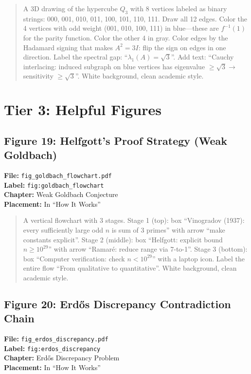 \begin{quote}
A 3D drawing of the hypercube $Q_3$ with 8 vertices labeled as binary strings: 000, 001, 010, 011, 100, 101, 110, 111. Draw all 12 edges. Color the 4 vertices with odd weight (001, 010, 100, 111) in blue---these are $f^{-1}(1)$ for the parity function. Color the other 4 in gray. Color edges by the Hadamard signing that makes $A^2 = 3I$: flip the sign on edges in one direction. Label the spectral gap: ``$\lambda_1(A) = \sqrt{3}$''. Add text: ``Cauchy interlacing: induced subgraph on blue vertices has eigenvalue $\geq \sqrt{3} \to$ sensitivity $\geq \sqrt{3}$''. White background, clean academic style.
\end{quote}


\section*{Tier 3: Helpful Figures}

\subsection*{Figure 19: Helfgott's Proof Strategy (Weak Goldbach)}
\textbf{File:} \texttt{fig\_goldbach\_flowchart.pdf} \\
\textbf{Label:} \texttt{fig:goldbach\_flowchart} \\
\textbf{Chapter:} Weak Goldbach Conjecture \\
\textbf{Placement:} In ``How It Works''

\begin{quote}
A vertical flowchart with 3 stages. Stage 1 (top): box ``Vinogradov (1937): every sufficiently large odd $n$ is sum of 3 primes'' with arrow ``make constants explicit''. Stage 2 (middle): box ``Helfgott: explicit bound $n \geq 10^{29}$'' with arrow ``Ramar\'{e}: reduce range via 7-to-1''. Stage 3 (bottom): box ``Computer verification: check $n < 10^{29}$'' with a laptop icon. Label the entire flow ``From qualitative to quantitative''. White background, clean academic style.
\end{quote}

\subsection*{Figure 20: Erdős Discrepancy Contradiction Chain}
\textbf{File:} \texttt{fig\_erdos\_discrepancy.pdf} \\
\textbf{Label:} \texttt{fig:erdos\_discrepancy} \\
\textbf{Chapter:} Erdős Discrepancy Problem \\
\textbf{Placement:} In ``How It Works''

